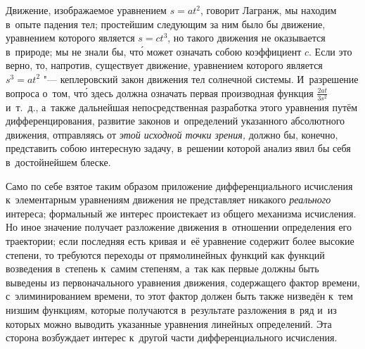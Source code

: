 Движение, изображаемое уравнением $s=at^2$, говорит Лагранж, мы находим в~опыте
падения тел; простейшим следующим за ним было бы движение, уравнением которого
является $s=ct^3$, но такого движения не оказывается в~природе; мы не знали бы,
чт\'{о} может означать собою коэффициент $c$. Если это верно, то, напротив,
существует движение, уравнением которого является $s^3=at^2$ "--- кеплеровский
закон движения тел солнечной системы. И~разрешение вопроса о~том, чт\'{о} здесь
должна означать первая производная функция $\frac{2at}{3s^2}$ и~т.~д., а~также
дальнейшая непосредственная разработка этого уравнения путём дифференцирования,
развитие законов и~определений указанного абсолютного движения, отправляясь от
{\em этой исходной точки зрения,} должно бы, конечно, представить собою
интересную задачу, в~решении которой анализ явил бы себя в~достойнейшем блеске.

Само по себе взятое таким образом приложение дифференциального исчисления
к~элементарным уравнениям движения не представляет никакого {\em реального} интереса;
формальный же интерес проистекает из общего механизма исчисления. Но иное
значение получает разложение движения в~отношении определения его траектории;
если последняя есть кривая и~её уравнение содержит более высокие степени, то требуются
переходы от прямолинейных функций как функций возведения в~степень к~самим степеням, а~так
как первые должны быть выведены из первоначального уравнения движения,
содержащего фактор времени, с~элиминированием времени, то этот фактор
должен быть также низведён к~тем низшим функциям, которые получаются
в~результате разложения в~ряд и~из которых
можно выводить указанные уравнения линейных определений. Эта сторона
возбуждает интерес к~другой части дифференциального исчисления.

